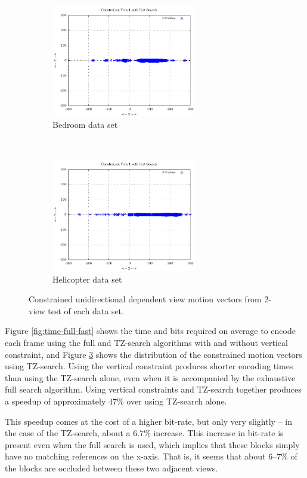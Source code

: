 \documentclass{sig-alternate-05-2015}
\begin{document}
\begin{figure}[h]
\centering
\begin{subfigure}{.5\textwidth}
\centering
\includegraphics[width=2.5in]{figures/bedroom1-inter-view-constrained-mvs.pdf}
\caption{Bedroom data set}
\label{fig:bedroom-inter-view-constrained-mvs}
\end{subfigure} \\
\begin{subfigure}{.5\textwidth}
\centering
\includegraphics[width=2.5in]{figures/helicopter-inter-view-constrained-mvs.pdf}
\caption{Helicopter data set}
\label{fig:helicopter-inter-view-constrained-mvs}
\end{subfigure}
\caption{Constrained unidirectional dependent view motion vectors from 2-view
test of each data set.}
\label{fig:inter-view-constrained-mvs}
\end{figure}

Figure \ref{fig:time-full-fast} shows the time and bits required on average to
encode each frame using the full and TZ-search algorithms with and without
vertical constraint, and Figure \ref{fig:inter-view-constrained-mvs} shows the
distribution of the constrained motion vectors using TZ-search. Using the
vertical constraint produces shorter encoding times than using the TZ-search
alone, even when it is accompanied by the exhaustive full search algorithm.
Using vertical constraints and TZ-search together produces a speedup of
approximately $47\%$ over using TZ-search alone.

This speedup comes at the cost of a higher bit-rate, but only very slightly
-- in the case of the TZ-search, about a $6.7\%$ increase. This increase in
bit-rate is present even when the full search is used, which implies that these
blocks simply have no matching references on the x-axis. That is, it seems that
about $6$--$7\%$ of the blocks are occluded between these two adjacent views.
\end{document}
